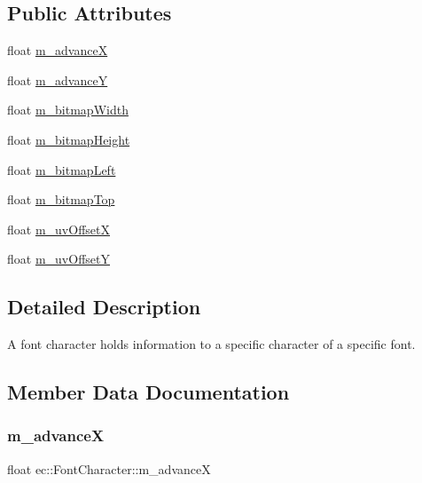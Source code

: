 \subsection*{Public Attributes}
\begin{DoxyCompactItemize}
\item 
float \mbox{\hyperlink{structec_1_1_font_character_a3dfcbeba30562b00daf057ac7d23c762}{m\+\_\+advanceX}}
\item 
float \mbox{\hyperlink{structec_1_1_font_character_afea51e45e05b1ac9bcf351184dde2286}{m\+\_\+advanceY}}
\item 
float \mbox{\hyperlink{structec_1_1_font_character_a29e1802582b887199a7c3484f7e99b09}{m\+\_\+bitmap\+Width}}
\item 
float \mbox{\hyperlink{structec_1_1_font_character_a4ab090e6a8358c152e94a931fe651423}{m\+\_\+bitmap\+Height}}
\item 
float \mbox{\hyperlink{structec_1_1_font_character_a5f666f5036f0ddf417c1b1e3475e433c}{m\+\_\+bitmap\+Left}}
\item 
float \mbox{\hyperlink{structec_1_1_font_character_a1555f3f60ade4c5a6a22f73d68710958}{m\+\_\+bitmap\+Top}}
\item 
float \mbox{\hyperlink{structec_1_1_font_character_a13e3f7cbc190b61581c6909bff262133}{m\+\_\+uv\+OffsetX}}
\item 
float \mbox{\hyperlink{structec_1_1_font_character_ac48d060931b82412610d9749b1374db3}{m\+\_\+uv\+OffsetY}}
\end{DoxyCompactItemize}


\subsection{Detailed Description}
A font character holds information to a specific character of a specific font. 

\subsection{Member Data Documentation}
\mbox{\label{structec_1_1_font_character_a3dfcbeba30562b00daf057ac7d23c762}} 
\subsubsection{\texorpdfstring{m\+\_\+advanceX}{m\_advanceX}}
{\footnotesize\ttfamily float ec\+::\+Font\+Character\+::m\+\_\+advanceX}

